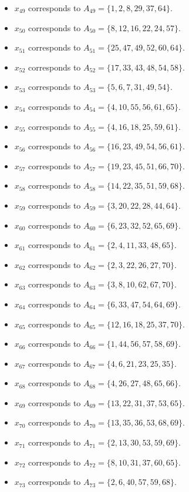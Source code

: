 \documentclass[11pt]{article}
\begin{document}
\begin{itemize}
\item $x_{49}$ corresponds to $A_{49}=\{1, 2, 8, 29, 37, 64\}$.
\item $x_{50}$ corresponds to $A_{50}=\{8, 12, 16, 22, 24, 57\}$.
\item $x_{51}$ corresponds to $A_{51}=\{25, 47, 49, 52, 60, 64\}$.
\item $x_{52}$ corresponds to $A_{52}=\{17, 33, 43, 48, 54, 58\}$.
\item $x_{53}$ corresponds to $A_{53}=\{5, 6, 7, 31, 49, 54\}$.
\item $x_{54}$ corresponds to $A_{54}=\{4, 10, 55, 56, 61, 65\}$.
\item $x_{55}$ corresponds to $A_{55}=\{4, 16, 18, 25, 59, 61\}$.
\item $x_{56}$ corresponds to $A_{56}=\{16, 23, 49, 54, 56, 61\}$.
\item $x_{57}$ corresponds to $A_{57}=\{19, 23, 45, 51, 66, 70\}$.
\item $x_{58}$ corresponds to $A_{58}=\{14, 22, 35, 51, 59, 68\}$.
\item $x_{59}$ corresponds to $A_{59}=\{3, 20, 22, 28, 44, 64\}$.
\item $x_{60}$ corresponds to $A_{60}=\{6, 23, 32, 52, 65, 69\}$.
\item $x_{61}$ corresponds to $A_{61}=\{2, 4, 11, 33, 48, 65\}$.
\item $x_{62}$ corresponds to $A_{62}=\{2, 3, 22, 26, 27, 70\}$.
\item $x_{63}$ corresponds to $A_{63}=\{3, 8, 10, 62, 67, 70\}$.
\item $x_{64}$ corresponds to $A_{64}=\{6, 33, 47, 54, 64, 69\}$.
\item $x_{65}$ corresponds to $A_{65}=\{12, 16, 18, 25, 37, 70\}$.
\item $x_{66}$ corresponds to $A_{66}=\{1, 44, 56, 57, 58, 69\}$.
\item $x_{67}$ corresponds to $A_{67}=\{4, 6, 21, 23, 25, 35\}$.
\item $x_{68}$ corresponds to $A_{68}=\{4, 26, 27, 48, 65, 66\}$.
\item $x_{69}$ corresponds to $A_{69}=\{13, 22, 31, 37, 53, 65\}$.
\item $x_{70}$ corresponds to $A_{70}=\{13, 35, 36, 53, 68, 69\}$.
\item $x_{71}$ corresponds to $A_{71}=\{2, 13, 30, 53, 59, 69\}$.
\item $x_{72}$ corresponds to $A_{72}=\{8, 10, 31, 37, 60, 65\}$.
\item $x_{73}$ corresponds to $A_{73}=\{2, 6, 40, 57, 59, 68\}$.

\end{itemize}
\end{document}
